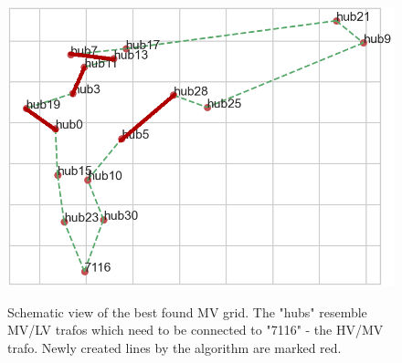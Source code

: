 \begin{figure}[h]
	\begin{centering}
		{\includegraphics[scale=0.6]{figures/experiments/1000_iter/best_mv_1000.png}}
		\caption{Schematic view of the best found MV grid. The "hubs" resemble MV/LV trafos which need to be connected to "7116" - the HV/MV trafo. Newly created lines by the algorithm are marked red.}
		\label{fig:best_mv_1000}
	\end{centering}
\end{figure}
